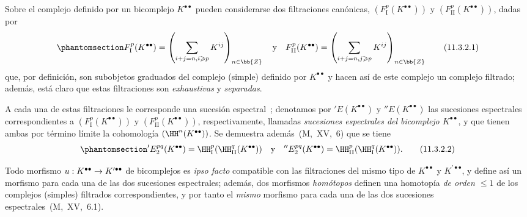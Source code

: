 \documentclass[oneside]{amsart}
\makeatletter
\renewcommand{\leq}{\leqslant}
\renewcommand{\geq}{\geqslant}
\newcommand{\ega@arrow}[2]{\mathchoice{#1}{#2}{#2}{#2}}
\renewcommand{\to}{\ega@arrow{\longrightarrow}{\rightarrow}}
\newcommand{\oldpage}[2][]{{\marginnote{\normalfont\textbf{#1}~|~#2}}\ignorespaces}
\let\EGAOriginalLabel\label
\renewcommand{\label}[1]{\phantomsection\EGAOriginalLabel{#1}}
\makeatother
\begin{document}
\begin{env}[11.3.2]
\label{0.11.3.2}
Sobre el complejo definido por un bicomplejo $K^{\bullet\bullet}$ pueden considerarse dos filtraciones canónicas, $(F_\mathrm{I}^p(K^{\bullet\bullet}))$ y $(F_\mathrm{II}^p(K^{\bullet\bullet}))$, dadas por
\[
\label{0.11.3.2.1}
  F_\mathrm{I}^p(K^{\bullet\bullet})
  = \left(\sum_{i+j=n,i\geq p}K^{ij}\right)_{n\in\bb{Z}}
  \quad\text{y}\quad
  F_\mathrm{II}^p(K^{\bullet\bullet})
  = \left(\sum_{i+j=n,j\geq p}K^{ij}\right)_{n\in\bb{Z}}
  \tag{11.3.2.1}
\]
\oldpage[0\textsubscript{III}]{30}
que, por definición, son subobjetos graduados del complejo (simple) definido por $K^{\bullet\bullet}$ y hacen así de este complejo un complejo filtrado;
además, está claro que estas filtraciones son \emph{exhaustivas} y \emph{separadas}.

A cada una de estas filtraciones le corresponde una sucesión espectral~;
denotamos por $'E(K^{\bullet\bullet})$ y $''E(K^{\bullet\bullet})$ las sucesiones espectrales correspondientes a $(F_\mathrm{I}^p(K^{\bullet\bullet}))$ y $(F_\mathrm{II}^p(K^{\bullet\bullet}))$, respectivamente, llamadas \emph{sucesiones espectrales del bicomplejo $K^{\bullet\bullet}$}, y que tienen ambas por término límite la cohomología $(\HH^n(K^{\bullet\bullet}))$.
Se demuestra además~(M,~XV,~6) que se tiene
\[
\label{0.11.3.2.2}
  'E_2^{pq}(K^{\bullet\bullet})
  = \HH_\mathrm{I}^p(\HH_\mathrm{II}^q(K^{\bullet\bullet}))
  \quad\text{y}\quad
  ''E_2^{pq}(K^{\bullet\bullet})
  = \HH_\mathrm{II}^p(\HH_\mathrm{I}^q(K^{\bullet\bullet})).
  \tag{11.3.2.2}
\]

Todo morfismo $u:K^{\bullet\bullet}\to K^{\prime\bullet\bullet}$ de bicomplejos es \emph{ipso facto} compatible con las filtraciones del mismo tipo de $K^{\bullet\bullet}$ y $K^{\prime\bullet\bullet}$, y define así un morfismo para cada una de las dos sucesiones espectrales;
además, dos morfismos \emph{homótopos} definen una homotopía \emph{de orden $\leq 1$} de los complejos (simples) filtrados correspondientes, y por tanto el \emph{mismo} morfismo para cada una de las dos sucesiones espectrales~(M,~XV,~6.1).
\end{env}
\end{document}

